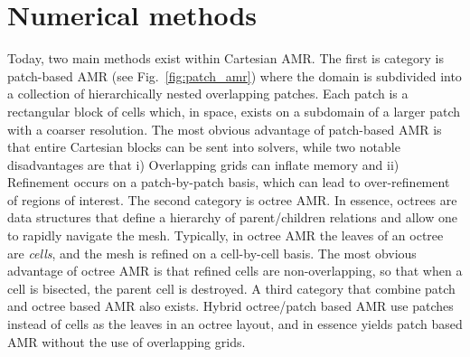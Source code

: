 \documentclass[3p]{elsarticle}
\begin{document}
\section{Numerical methods}
\label{sec:method}
Today, two main methods exist within Cartesian AMR. The first is category is patch-based AMR (see Fig.~\ref{fig:patch_amr}) where the domain is subdivided into a collection of hierarchically nested overlapping patches. Each patch is a rectangular block of cells which, in space, exists on a subdomain of a larger patch with a coarser resolution. The most obvious advantage of patch-based AMR is that entire Cartesian blocks can be sent into solvers, while two notable disadvantages are that i) Overlapping grids can inflate memory and ii) Refinement occurs on a patch-by-patch basis, which can lead to over-refinement of regions of interest. The second category is octree AMR. In essence, octrees are data structures that define a hierarchy of parent/children relations and allow one to rapidly navigate the mesh. Typically, in octree AMR the leaves of an octree are \emph{cells}, and the mesh is refined on a cell-by-cell basis. The most obvious advantage of octree AMR is that refined cells are non-overlapping, so that when a cell is bisected, the parent cell is destroyed. A third category that combine patch and octree based AMR also exists. Hybrid octree/patch based AMR use patches instead of cells as the leaves in an octree layout, and in essence yields patch based AMR without the use of overlapping grids.
\end{document}
